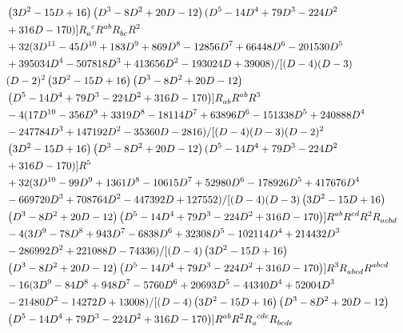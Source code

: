\documentclass[a4paper,11pt]{article}
\begin{document}
\begin{subequations}
\begin{align}
        &\quad\left(3 D^2-15 D+16\right) \left(D^3-8 D^2+20 D-12\right) (D^5-14 D^4+79 D^3-224 D^2\nonumber\\
        &\quad +316 D-170)]R\indices{_a^c}R\indices{^a^b}R\indices{_b_c}R^2\nonumber\\
        & \quad + 32 (3 D^{11}-45 D^{10}+183 D^9+869 D^8-12856 D^7+66448 D^6-201530 D^5\nonumber\\
        &\quad+395034 D^4-507818 D^3+413656 D^2-193024 D+39008) / [(D-4) (D-3)\nonumber\\
        &\quad(D-2)^2 \left(3 D^2-15 D+16\right) \left(D^3-8 D^2+20 D-12\right)\nonumber\\
        &\quad\left(D^5-14 D^4+79 D^3-224 D^2+316 D-170\right)]R\indices{_a_b}R\indices{^a^b}R^3\nonumber\\
        & \quad -4 (17 D^{10}-356 D^9+3319 D^8-18114 D^7+63896 D^6-151338 D^5+240888 D^4\nonumber\\
        &\quad-247784 D^3+147192 D^2-35360 D-2816)/[(D-4) (D-3) (D-2)^2 \nonumber\\
        &\quad\left(3 D^2-15 D+16\right) \left(D^3-8 D^2+20 D-12\right) (D^5-14 D^4+79 D^3-224 D^2\nonumber\\
        &\quad+316 D-170)]R^5\nonumber\\
        & \quad + 32 (3 D^{10}-99 D^9+1361 D^8-10615 D^7+52980 D^6-178926 D^5+417676 D^4\nonumber\\
        &\quad-669720 D^3+708764 D^2-447392 D+127552)/[(D-4) (D-3) \left(3 D^2-15 D+16\right) \nonumber\\
        &\quad\left(D^3-8 D^2+20 D-12\right) \left(D^5-14 D^4+79 D^3-224 D^2+316 D-170\right)]R\indices{^a^b}R\indices{^c^d}R^2R\indices{_a_c_b_d}\nonumber\\
        & \quad -4 (3 D^9-78 D^8+943 D^7-6838 D^6+32308 D^5-102114 D^4+214432 D^3\nonumber\\
        &\quad -286992 D^2+221088 D-74336)/[(D-4) \left(3 D^2-15 D+16\right) \nonumber\\
        &\quad \left(D^3-8 D^2+20 D-12\right) \left(D^5-14 D^4+79 D^3-224 D^2+316 D-170\right)]R^3R\indices{_a_b_c_d}R\indices{^a^b^c^d}\nonumber\\
        & \quad - 16 (3 D^9-84 D^8+948 D^7-5760 D^6+20693 D^5-44340 D^4+52004 D^3\nonumber\\
        &\quad-21480 D^2-14272 D+13008)/[(D-4) \left(3 D^2-15 D+16\right) \left(D^3-8 D^2+20 D-12\right)\nonumber\\
        &\quad\left(D^5-14 D^4+79 D^3-224 D^2+316 D-170\right)]R\indices{^a^b}R^2R\indices{_a^c^d^e}R\indices{_b_c_d_e}\nonumber\\

\end{align}
\end{subequations}
\end{document}
